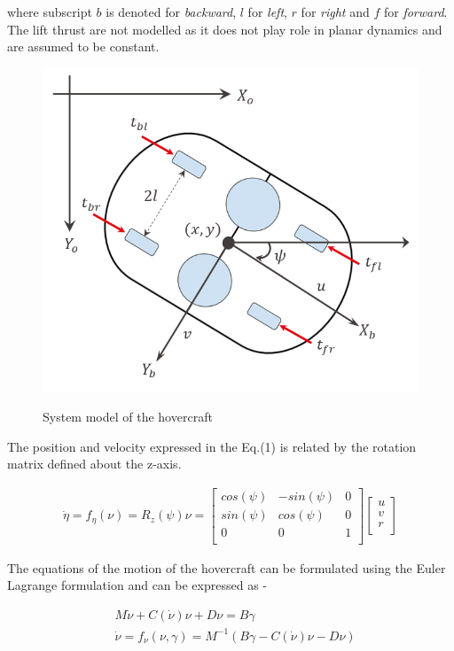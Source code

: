 \documentclass[12pt,titlepage]{article}
\begin{document}
where subscript $b$ is denoted for \textit{backward}, $l$ for \textit{left}, $r$ for \textit{right} and $f$ for \textit{forward}. The lift thrust are not modelled as it does not play role in planar dynamics and are assumed to be constant. 

\begin{figure}[H]
    \centering
    \includegraphics[width=0.5\columnwidth]{Images/hovercraft_model.PNG}\\
    \caption{System model of the hovercraft}
    \label{fig:sysmodel}
\end{figure}

The position and velocity expressed in the Eq.(1) is related by the rotation matrix defined about the z-axis. 

\begin{align}
\dot{\eta} = f_\eta(\nu) = R_z(\psi)\nu =
\begin{bmatrix}
    cos(\psi) & -sin(\psi) & 0 \\
    sin(\psi) & cos(\psi) & 0 \\
    0 & 0 & 1 \\
\end{bmatrix}
\begin{bmatrix}
    u \\
    v \\
    r \\
\end{bmatrix}
\end{align}


The equations of the motion of the hovercraft can be formulated using the Euler Lagrange formulation and can be expressed as - 

\begin{subequations}
\begin{alignat}{2}
    & M\dot{\nu} + C(\dot{\nu})\nu + D\nu = B\gamma \\
    & \dot{\nu} = f_\nu(\nu,\gamma) = M^{-1}(B\gamma - C(\dot{\nu})\nu - D\nu)
\end{alignat}
\end{subequations}
    
\end{document}
